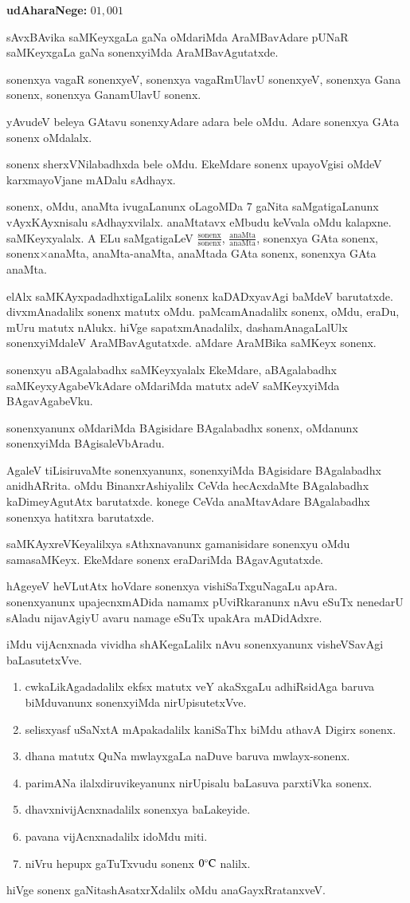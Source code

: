 \textbf{udAharaNege:} $01,001$

sAvxBAvika saMKeyxgaLa gaNa oMdariMda AraMBavAdare pUNaR saMKeyxgaLa gaNa sonenx\-yiMda AraMBavAgutatxde.

sonenxya vagaR sonenxyeV, sonenxya vagaRmUlavU sonenxyeV, sonenxya Gana sonenx, sonenxya GanamUlavU sonenx.

yAvudeV beleya GAtavu sonenxyAdare adara bele oMdu. Adare sonenxya GAta sonenx oMdalalx.

sonenx sherxVNilabadhxda bele oMdu. EkeMdare sonenx upayoVgisi oMdeV karxma\-yoVjane mADalu sAdhayx.

sonenx, oMdu, anaMta ivugaLanunx oLagoMDa $7$ gaNita saMgatigaLanunx vAyxKAyx\-nisalu sAdhayxvilalx. anaMtatavx eMbudu keVvala oMdu kalapxne. saMKeyxyalalx. A ELu saMgatigaLeV $\frac{\text{sonenx}}{\text{sonenx}}$, $\frac{\text{anaMta}}{\text{anaMta}}$, sonenxya GAta sonenx, sonenx$\times$anaMta, anaMta-anaMta, anaMtada GAta sonenx, sonenxya GAta anaMta.

elAlx saMKAyxpadadhxtigaLalilx sonenx kaDADxyavAgi baMdeV barutatxde. divxmAnadalilx sonenx matutx oMdu. paMcamAnadalilx sonenx, oMdu, eraDu, mUru matutx nAlukx. hiVge sapatxmAnadalilx, dashamAnagaLalUlx sonenxyiMdaleV AraMBavAgutatxde. aMdare AraMBika saMKeyx sonenx.

sonenxyu aBAgalabadhx saMKeyxyalalx EkeMdare, aBAgalabadhx saMKeyxyAgabeVkAdare oMdariMda matutx adeV saMKeyxyiMda BAgavAgabeVku.

sonenxyanunx oMdariMda BAgisidare BAgalabadhx sonenx, oMdanunx sonenxyiMda BAgisaleVbAradu.

AgaleV tiLisiruvaMte sonenxyanunx, sonenxyiMda BAgisidare BAgalabadhx anidhAR\-rita. oMdu BinanxrAshiyalilx CeVda hecAcxdaMte BAgalabadhx kaDimeyAgutAtx barutatxde. konege CeVda anaMtavAdare BAgalabadhx sonenxya hatitxra barutatxde.

saMKAyxreVKeyalilxya sAthxnavanunx gamanisidare sonenxyu oMdu samasaMKeyx. EkeMdare sonenx eraDariMda BAgavAgutatxde.

hAgeyeV heVLutAtx hoVdare sonenxya vishiSaTxguNagaLu apAra. sonenxyanunx upajecnxmADida namamx pUviRkaranunx nAvu eSuTx nenedarU sAladu nijavAgiyU avaru namage eSuTx upakAra mADidAdxre.

iMdu vijAcnxnada vividha shAKegaLalilx nAvu sonenxyanunx visheVSavAgi baLasutetxVve.

\begin{enumerate}[{\rm 1.}]
\item cwkaLikAgadadalilx ekfsx matutx veY akaSxgaLu adhiRsidAga baruva biMduvanunx sonenxyiMda nirUpisutetxVve.
\item selisxyasf uSaNxtA mApakadalilx kaniSaThx biMdu athavA Digirx sonenx.
\item dhana matutx QuNa mwlayxgaLa naDuve baruva mwlayx-sonenx.
\item parimANa ilalxdiruvikeyanunx nirUpisalu baLasuva parxtiVka sonenx.
\item dhavxnivijAcnxnadalilx sonenxya baLakeyide.
\item pavana vijAcnxnadalilx idoMdu miti.
\item niVru hepupx gaTuTxvudu sonenx $0^{\circ}{\rm C}$ nalilx.
\end{enumerate}
hiVge sonenx gaNitashAsatxrXdalilx oMdu anaGayxRratanxveV.
